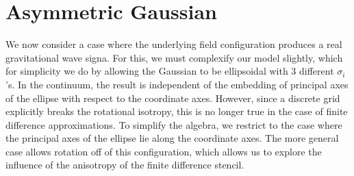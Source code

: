 \documentclass{revtex4}
\begin{document}
\section{Asymmetric Gaussian}
We now consider a case where the underlying field configuration produces a real gravitational wave signa.
For this, we must complexify our model slightly, which for simplicity we do by allowing the Gaussian to be ellipsoidal with 3 different $\sigma_i$'s.
In the continuum, the result is independent of the embedding of principal axes of the ellipse with respect to the coordinate axes.
However, since a discrete grid explicitly breaks the rotational isotropy, this is no longer true in the case of finite difference approximations.
To simplify the algebra, we restrict to the case where the principal axes of the ellipse lie along the coordinate axes.
The more general case allows rotation off of this configuration, which allows us to explore the influence of the anisotropy of the finite difference stencil.
\end{document}
